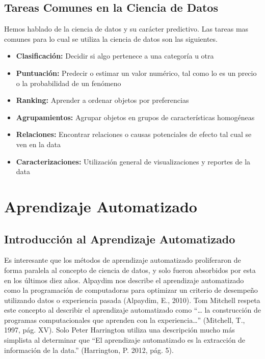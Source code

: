 \documentclass[letterpaper, spanish, 11pt]{report}
\begin{document}
\subsection{Tareas Comunes en la Ciencia de Datos}
Hemos hablado de la ciencia de datos y su carácter predictivo. Las tareas mas comunes para lo cual se utiliza la ciencia de datos son las siguientes.

\begin{itemize}
	\item \textbf{Clasificación:} Decidir si algo pertenece a una categoría u otra
	\item \textbf{Puntuación:} Predecir o estimar un valor numérico, tal como lo es un precio o la probabilidad de un fenómeno
	\item \textbf{Ranking:} Aprender a ordenar objetos por preferencias
	\item \textbf{Agrupamientos:} Agrupar objetos en grupos de características homogéneas
	\item \textbf{Relaciones:} Encontrar relaciones o causas potenciales de efecto tal cual se ven en la data
	\item \textbf{Caracterizaciones:} Utilización general de visualizaciones y reportes de la data
\end{itemize}

\section{Aprendizaje Automatizado}

\subsection{Introducción al Aprendizaje Automatizado}
Es interesante que los métodos de aprendizaje automatizado proliferaron de forma paralela al concepto de ciencia de datos, y solo fueron absorbidos por esta en los últimos diez años. Alpaydim nos describe el aprendizaje automatizado como la programación de computadoras para optimizar un criterio de desempeño utilizando datos o experiencia pasada (Alpaydim, E., 2010). Tom Mitchell respeta este concepto al describir el aprendizaje automatizado como “… la construcción de programas computacionales que aprenden con la experiencia…” (Mitchell, T., 1997, pág. XV). Solo Peter Harrington utiliza una descripción mucho más simplista al determinar que “El aprendizaje automatizado es la extracción de información de la data.” (Harrington, P. 2012, pág. 5).
\end{document}
